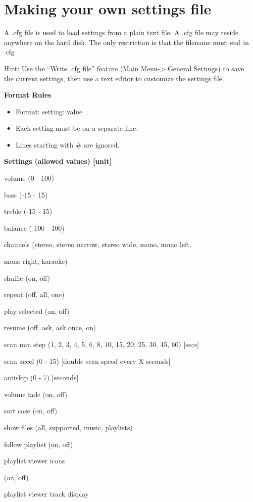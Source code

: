 \section{\label{ref:SettingsFile}Making your own settings file}
A .cfg file is used to load settings from a plain text file. A .cfg file
may reside anywhere on the hard disk. The only restriction is that the
filename must end in .cfg

Hint: Use the ``Write .cfg file'' feature
(Main Menu{}-{\textgreater} General Settings) to save the current
settings, then use a text editor to customize the settings file.

{\bfseries
Format Rules}

\begin{itemize}
\item Format: setting: value
\item Each setting must be on a separate line.
\item Lines starting with \# are ignored.
\end{itemize}
{\bfseries
Settings    (allowed values) [unit]}

volume   (0 {}- 100)

bass    ({}-15 {}- 15)

treble    ({}-15 {}- 15)

balance   ({}-100 {}- 100)

channels   (stereo, stereo narrow, stereo wide, mono, mono left,

     mono right, karaoke)

shuffle   (on, off)

repeat   (off, all, one)

play selected  (on, off)

resume   (off, ask, ask once, on)

scan min step  (1, 2, 3, 4, 5, 6, 8, 10, 15, 20, 25, 30, 45, 60) [secs]

scan accel   (0 {}- 15) [double scan speed every X seconds]

antiskip   (0 {}- 7) [seconds]

volume fade  (on, off)

sort case   (on, off)

show files   (all, supported, music, playlists)

follow playlist  (on, off)

playlist viewer icons

    (on, off)

playlist viewer track display

